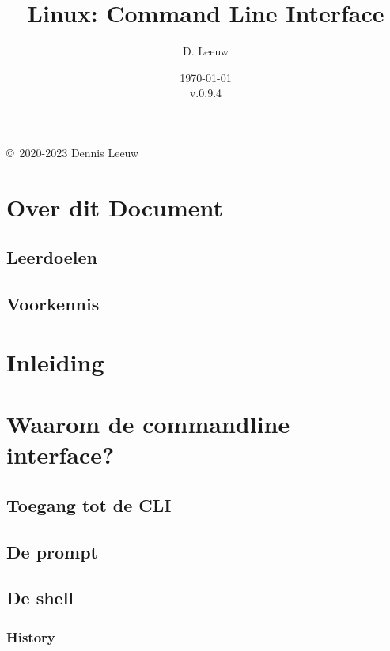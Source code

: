 \documentclass[a4paper,12pt,twoside,openright,titlepage]{book}
\author{D. Leeuw}
\title{Linux: Command Line Interface}
\date{\today\\v.0.9.4}
\begin{document}

\maketitle

\copyright\ 2020-2023 Dennis Leeuw\\




\frontmatter
\chapter{Over dit Document}
\section{Leerdoelen}

\section{Voorkennis}

%
%

\tableofcontents

\mainmatter
\chapter{Inleiding}


\chapter{Waarom de commandline interface?}

\section{Toegang tot de CLI}

\section{De prompt}

\section{De shell}

\subsection{History}

\end{document}
